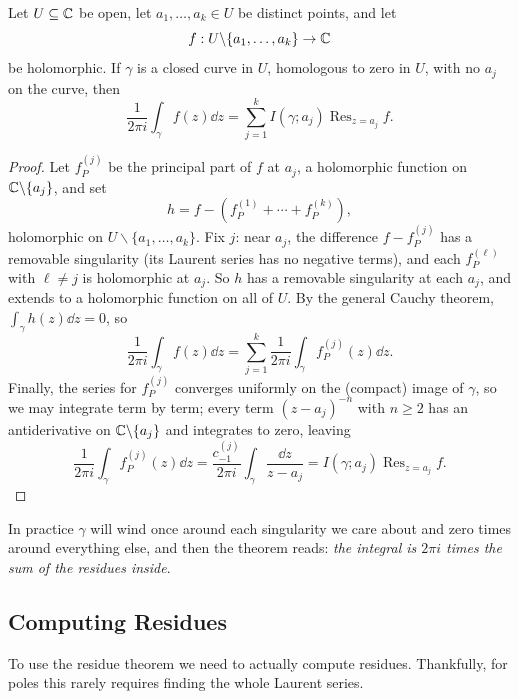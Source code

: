 \documentclass[a4paper]{scrartcl}
\begin{document}
\begin{theorem}
    Let $U \subseteq \mathbb{C}$ be open, let $a_1, \dots, a_k \in U$ be distinct points, and let
    $$
    f: U \backslash \{a_1, \dots, a_k\} \rightarrow \mathbb{C}
    $$
    be holomorphic. If $\gamma$ is a closed curve in $U$, homologous to zero in $U$, with no $a_j$ on the curve, then
    $$
    \frac{1}{2 \pi i} \int_\gamma f(z) \dd z = \sum_{j = 1}^{k} I(\gamma; a_j) \operatorname{Res}_{z = a_j} f.
    $$
\end{theorem}
\begin{proof}
    Let $f_P^{(j)}$ be the principal part of $f$ at $a_j$, a holomorphic function on $\mathbb{C} \backslash \{a_j\}$, and set
    $$
    h = f - \left(f_P^{(1)} + \cdots + f_P^{(k)}\right),
    $$
    holomorphic on $U \backslash \{a_1, \dots, a_k\}$. Fix $j$: near $a_j$, the difference $f - f_P^{(j)}$ has a removable singularity (its Laurent series has no negative terms), and each $f_P^{(\ell)}$ with $\ell \neq j$ is holomorphic at $a_j$. So $h$ has a removable singularity at each $a_j$, and extends to a holomorphic function on all of $U$. By the general Cauchy theorem, $\int_\gamma h(z) \dd z = 0$, so
    $$
    \frac{1}{2 \pi i}\int_\gamma f(z) \dd z = \sum_{j = 1}^{k} \frac{1}{2 \pi i}\int_\gamma f_P^{(j)}(z) \dd z.
    $$
    Finally, the series for $f_P^{(j)}$ converges uniformly on the (compact) image of $\gamma$, so we may integrate term by term; every term $(z - a_j)^{-n}$ with $n \geq 2$ has an antiderivative on $\mathbb{C} \backslash \{a_j\}$ and integrates to zero, leaving
    \[
    \frac{1}{2 \pi i} \int_\gamma f_P^{(j)}(z) \dd z = \frac{c^{(j)}_{-1}}{2 \pi i} \int_\gamma \frac{\dd z}{z - a_j} = I(\gamma; a_j)\operatorname{Res}_{z = a_j} f.
    \]
\end{proof}

In practice $\gamma$ will wind once around each singularity we care about and zero times around everything else, and then the theorem reads: \emph{the integral is $2\pi i$ times the sum of the residues inside}.

\subsection{Computing Residues}

To use the residue theorem we need to actually compute residues. Thankfully, for poles this rarely requires finding the whole Laurent series.
\end{document}

